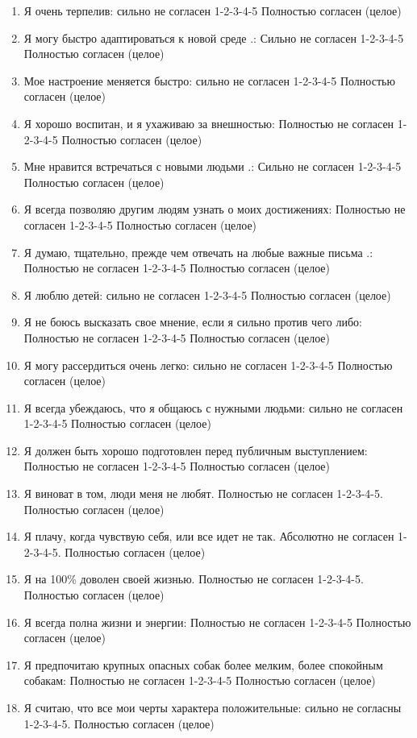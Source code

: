 \documentclass[11pt]{article}
\begin{document}
\begin{enumerate}
\item Я очень терпелив: сильно не согласен 1-2-3-4-5 Полностью согласен (целое)
\item Я могу быстро адаптироваться к новой среде .: Сильно не согласен 1-2-3-4-5 Полностью согласен (целое)
\item Мое настроение меняется быстро: сильно не согласен 1-2-3-4-5 Полностью согласен (целое)
\item Я хорошо воспитан, и я ухаживаю за внешностью: Полностью не согласен 1-2-3-4-5 Полностью согласен (целое)
\item Мне нравится встречаться с новыми людьми .: Сильно не согласен 1-2-3-4-5 Полностью согласен (целое)
\item Я всегда позволяю другим людям узнать о моих достижениях: Полностью не согласен 1-2-3-4-5 Полностью согласен (целое)
\item Я думаю, тщательно, прежде чем отвечать на любые важные письма .: Полностью не согласен 1-2-3-4-5 Полностью согласен (целое)
\item Я люблю детей: сильно не согласен 1-2-3-4-5 Полностью согласен (целое)
\item Я не боюсь высказать свое мнение, если я сильно против чего либо: Полностью не согласен 1-2-3-4-5 Полностью согласен (целое)
\item Я могу рассердиться очень легко: сильно не согласен 1-2-3-4-5 Полностью согласен (целое)
\item Я всегда убеждаюсь, что я общаюсь с нужными людьми: сильно не согласен 1-2-3-4-5 Полностью согласен (целое)
\item Я должен быть хорошо подготовлен перед публичным выступлением: Полностью не согласен 1-2-3-4-5 Полностью согласен (целое)
\item Я виноват в том, люди меня не любят. Полностью не согласен 1-2-3-4-5. Полностью согласен (целое)
\item Я плачу, когда чувствую себя, или все идет не так. Абсолютно не согласен 1-2-3-4-5. Полностью согласен (целое)
\item Я на 100\% доволен своей жизнью. Полностью не согласен 1-2-3-4-5. Полностью согласен (целое)
\item Я всегда полна жизни и энергии: Полностью не согласен 1-2-3-4-5 Полностью согласен (целое)
\item Я предпочитаю крупных опасных собак более мелким, более спокойным собакам: Полностью не согласен 1-2-3-4-5 Полностью согласен (целое)
\item Я считаю, что все мои черты характера положительные: сильно не согласны 1-2-3-4-5. Полностью согласен (целое)

\end{enumerate}
\end{document}
